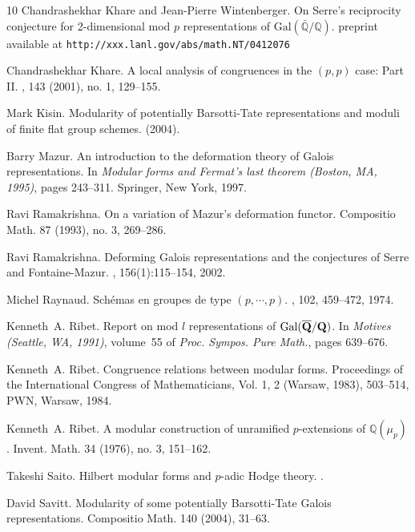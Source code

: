 \documentclass[12pt]{amsart}
\newcommand{\Q}{\mathbb{Q}}
\newcommand{\Galois}{\mathrm{Gal}}
\newcommand{\Gal}{\Galois( \bar{ {\mathbb Q}}/{\mathbb Q})}
\begin{document}
\begin{thebibliography}{10}
Chandrashekhar Khare and Jean-Pierre Wintenberger.
\newblock On Serre's reciprocity conjecture for 2-dimensional mod $p$ representations of $\Gal$.
\newblock preprint available at {\tt http://xxx.lanl.gov/abs/math.NT/0412076}

Chandrashekhar Khare.
\newblock A local analysis of congruences in the $(p,p)$ case: Part II.  
,  143  (2001),  no. 1, 129--155.

Mark Kisin.
\newblock Modularity of potentially {B}arsotti-{T}ate representations and
  moduli of finite flat group schemes.
 (2004).

Barry Mazur.
\newblock An introduction to the deformation theory of {G}alois
  representations.
\newblock In {\em Modular forms and Fermat's last theorem (Boston, MA, 1995)},
  pages 243--311. Springer, New York, 1997.

\bibitem{[R00]}
Ravi Ramakrishna.
\newblock On a variation of Mazur's deformation functor.  
\newblock Compositio Math.  87  (1993),  no. 3, 269--286.

\bibitem{[R02]}
Ravi Ramakrishna.
\newblock Deforming {G}alois representations and the conjectures of {S}erre and
  {F}ontaine-{M}azur.
, 156(1):115--154, 2002.

Michel Raynaud.
\newblock Sch\'emas en groupes de type $(p,\cdots,p)$.
, 102, 459--472, 1974.

Kenneth~A. Ribet.
\newblock Report on mod {$l$} representations of {${\rm Gal}(\overline{\bf
  Q}/{\bf Q})$}.
\newblock In {\em Motives (Seattle, WA, 1991)}, volume~55 of {\em Proc. Sympos.
  Pure Math.}, pages 639--676.

Kenneth~A. Ribet.
\newblock Congruence relations between modular forms. 
\newblock  Proceedings of the International Congress of Mathematicians, Vol. 1, 2 (Warsaw, 1983),  503--514, PWN, Warsaw, 1984. 

Kenneth~A. Ribet.
\newblock  A modular construction of unramified $p$-extensions of
$\Q(\mu_{p})$.  
\newblock Invent. Math.  34  (1976), no. 3, 151--162.


Takeshi Saito.
\newblock Hilbert modular forms and $p$-adic {H}odge theory.
.

David Savitt.
\newblock Modularity of some potentially {B}arsotti-{T}ate {G}alois
  representations.
\newblock Compositio Math. 140 (2004), 31--63.


\end{thebibliography}
\end{document}
